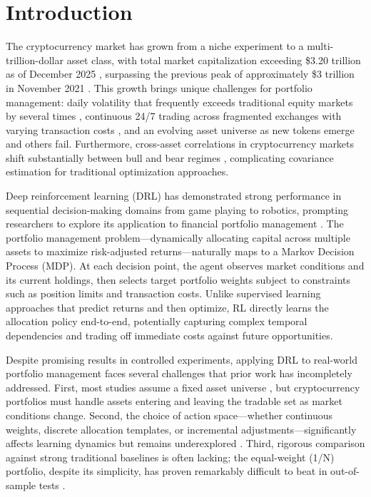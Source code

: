 
\section{Introduction}
\label{sec:introduction}

The cryptocurrency market has grown from a niche experiment to a multi-trillion-dollar asset class, with total market capitalization exceeding \$3.20 trillion as of December 2025 \cite{forbes2025crypto}, surpassing the previous peak of approximately \$3 trillion in November 2021 \cite{pessa2023age, watorek2023crypto}. This growth brings unique challenges for portfolio management: daily volatility that frequently exceeds traditional equity markets by several times \cite{bergsli2022volatility, naimy2021garch}, continuous 24/7 trading across fragmented exchanges with varying transaction costs \cite{barbon2021exchanges, kim2017transaction}, and an evolving asset universe as new tokens emerge and others fail. Furthermore, cross-asset correlations in cryptocurrency markets shift substantially between bull and bear regimes \cite{james2022correlations}, complicating covariance estimation for traditional optimization approaches.

Deep reinforcement learning (DRL) has demonstrated strong performance in sequential decision-making domains from game playing to robotics, prompting researchers to explore its application to financial portfolio management \cite{jiang2017eIIE, lucarelli2020dqlcrypto}. The portfolio management problem---dynamically allocating capital across multiple assets to maximize risk-adjusted returns---naturally maps to a Markov Decision Process (MDP). At each decision point, the agent observes market conditions and its current holdings, then selects target portfolio weights subject to constraints such as position limits and transaction costs. Unlike supervised learning approaches that predict returns and then optimize, RL directly learns the allocation policy end-to-end, potentially capturing complex temporal dependencies and trading off immediate costs against future opportunities.

Despite promising results in controlled experiments, applying DRL to real-world portfolio management faces several challenges that prior work has incompletely addressed. First, most studies assume a fixed asset universe \cite{jiang2017eIIE, ye2020sarl}, but cryptocurrency portfolios must handle assets entering and leaving the tradable set as market conditions change. Second, the choice of action space---whether continuous weights, discrete allocation templates, or incremental adjustments---significantly affects learning dynamics but remains underexplored \cite{lucarelli2020dqlcrypto}. Third, rigorous comparison against strong traditional baselines is often lacking; the equal-weight (1/N) portfolio, despite its simplicity, has proven remarkably difficult to beat in out-of-sample tests \cite{demiguel2009optimal}.

